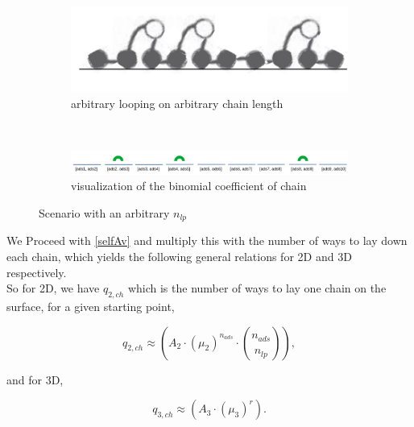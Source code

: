 \documentclass[10pt,letterpaper]{article}
\begin{document}
\begin{figure}[H]
	\centering
	\begin{subfigure}[b]{0.6\textwidth}
		\centering
		\includegraphics[scale=0.6]{multiloops.png}
		\caption{arbitrary looping on arbitrary chain length}
		\label{loop and train}
	\end{subfigure}\\
	\begin{subfigure}[b]{1.0\textwidth}
		\centering
		\includegraphics[scale=0.35]{LoopingGraphic.pdf}
		\caption{visualization of the binomial coefficient of chain}
		\label{loop and train}		
	\end{subfigure}
\caption{Scenario with an arbitrary $n_{lp}$}
\label{arbChoice}
\end{figure}



\noindent We Proceed with \ref{selfAv} and multiply this with the number of ways to lay down each chain, which yields the following general relations for 2D and 3D respectively.\\ 


\noindent So for 2D, we have $q_{2,ch}$ which is
the number of ways to lay one chain on the surface, for a given starting point,

\begin{equation}
    \boxed{
    	q_{2,ch}\approx \left(A_2\cdot (\mu_{2})^{n_{ads}} \cdot \binom{n_{ads}}{n_{lp}} \right), 
    }
	\label{eq. q2}
\end{equation}

\noindent and for 3D, 

\begin{equation}
    \boxed{
	    q_{3,ch}\approx \left(A_3\cdot (\mu_{3})^{r}\right).
	}
	\label{eq. q3}
\end{equation}



%
\end{document}
